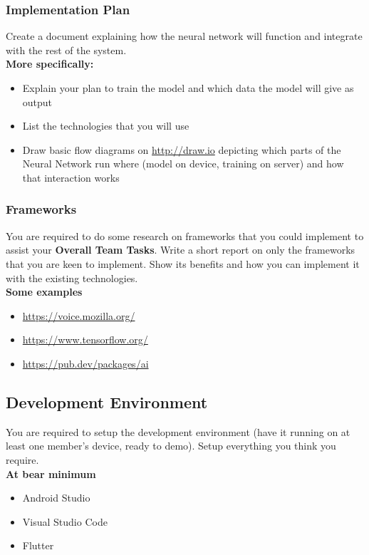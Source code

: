 \documentclass{article}
\begin{document}
\subsubsection{Implementation Plan}
Create a document explaining how the neural network will function and integrate with the rest of the system. \\

\textbf{More specifically:}
\begin{itemize}
    \item Explain your plan to train the model and which data the model will give as output
    \item List the technologies that you will use 
    \item Draw basic flow diagrams on \url{http://draw.io} depicting which parts of the Neural Network run where (model on device, training on server) and how that interaction works
    
\end{itemize}

\subsubsection{Frameworks}
You are required to do some research on frameworks that you could implement to assist your \textbf{Overall Team Tasks}. Write a short report on only the frameworks that you are keen to implement. Show its benefits and how you can implement it with the existing technologies. \\

\textbf{Some examples}
\begin{itemize}
    \item \url{https://voice.mozilla.org/}
    \item \url{https://www.tensorflow.org/}
    \item \url{https://pub.dev/packages/ai}
\end{itemize}

\newpage

\subsection{Development Environment}
You are required to setup the development environment (have it running on at least one member's device, ready to demo). Setup everything you think you require. \\
\newline
\textbf{At bear minimum}
\begin{itemize}
    \item Android Studio
    \item Visual Studio Code
    \item Flutter
\end{itemize}
\end{document}
